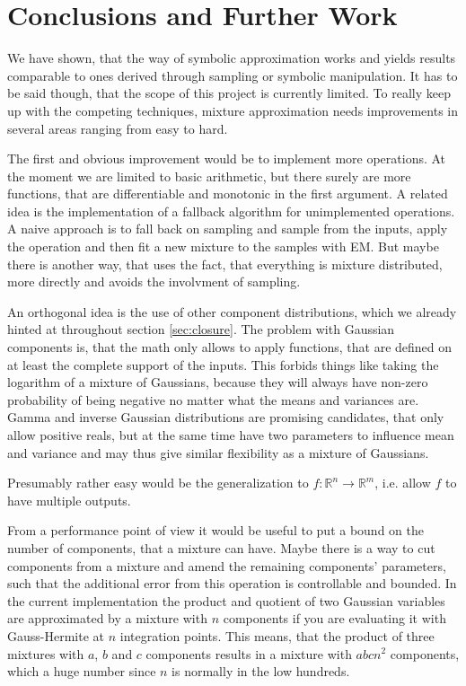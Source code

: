 \documentclass[11pt,a4paper]{book}
\begin{document}
\chapter{Conclusions and Further Work}
\label{ch:conclusions}

We have shown, that the way of symbolic approximation works and yields results
comparable to ones derived through sampling or symbolic manipulation. It has to
be said though, that the scope of this project is currently limited. To really
keep up with the competing techniques, mixture approximation needs improvements
in several areas ranging from easy to hard.

The first and obvious improvement would be to implement more operations. At the
moment we are limited to basic arithmetic, but there surely are more functions,
that are differentiable and monotonic in the first argument. A related idea is
the implementation of a fallback algorithm for unimplemented operations. A naive
approach is to fall back on sampling and sample from the inputs, apply the
operation and then fit a new mixture to the samples with EM. But maybe there is
another way, that uses the fact, that everything is mixture distributed, more
directly and avoids the involvment of sampling.

An orthogonal idea is the use of other component distributions, which we already
hinted at throughout section \ref{sec:closure}. The problem with Gaussian
components is, that the math only allows to apply functions, that are defined on
at least the complete support of the inputs. This forbids things like taking the
logarithm of a mixture of Gaussians, because they will always have non-zero
probability of being negative no matter what the means and variances are. Gamma
and inverse Gaussian distributions are promising candidates, that only allow
positive reals, but at the same time have two parameters to influence mean and
variance and may thus give similar flexibility as a mixture of Gaussians.

Presumably rather easy would be the generalization to
$f : \mathbb{R}^{n} \rightarrow \mathbb{R}^{m}$, i.e. allow $f$ to have multiple
outputs.

From a performance point of view it would be useful to put a bound on the number
of components, that a mixture can have. Maybe there is a way to cut components
from a mixture and amend the remaining components' parameters, such that the
additional error from this operation is controllable and bounded. In the current
implementation the product and quotient of two Gaussian variables are
approximated by a mixture with $n$ components if you are evaluating it with
Gauss-Hermite at $n$ integration points. This means, that the product of three
mixtures with $a$, $b$ and $c$ components results in a mixture with $abcn^{2}$
components, which a huge number since $n$ is normally in the low hundreds.
\end{document}

